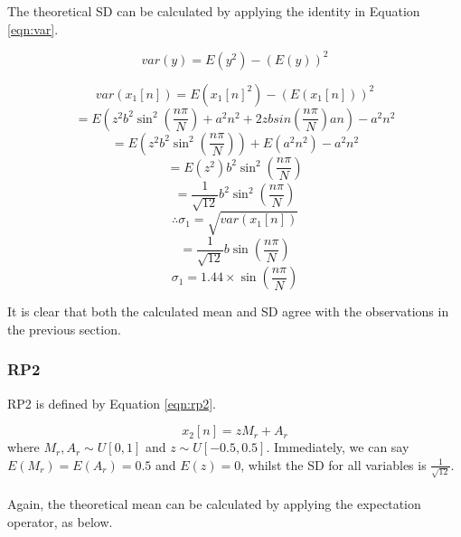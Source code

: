 \noindent
The theoretical SD can be calculated by applying the identity in Equation \ref{eqn:var}.

\begin{equation}
    \textit{var}(y) = E(y^2) - (E(y))^2
    \label{eqn:var}
\end{equation}
\begin{center}
\begin{equation}
    var(x_{1}[n]) = E({x_{1}[n]}^2) - (E({x_{1}[n]}))^2 
\end{equation}
\begin{equation}
= E(z^{2}b^{2}\sin^{2}(\frac{n \pi}{N}) + a^{2}n^{2}+2zb sin(\frac{n \pi}{N})an) - a^{2}n^{2}
\end{equation}
\begin{equation}
=E(z^{2} b^{2} \sin ^{2}(\frac{n \pi}{N}))+E(a^{2} n^{2})-a^{2} n^{2}
\end{equation}
\begin{equation}
=E(z^{2}) b^{2} \sin ^{2}(\frac{n \pi}{N})
\end{equation}
\begin{equation}
= \frac{1}{\sqrt{12}} b^{2} \sin ^{2}(\frac{n \pi}{N})
\end{equation}
\begin{equation}
\therefore \sigma_{1} =\sqrt{{var}(x_{1}[n])}
\end{equation}
\begin{equation}
=\frac{1}{\sqrt{12}} b \sin (\frac{n \pi}{N})
\end{equation}
\begin{equation}
\sigma_{1}=1.44 \times \sin \left(\frac{n \pi}{N}\right)
\end{equation}
\end{center}

\noindent
It is clear that both the calculated mean and SD agree with the observations in the previous section.

\subsubsection*{RP2}

RP2 is defined by Equation \ref{eqn:rp2}.

\begin{equation}
    x_{2}[n] = zM_{r} + A_{r}
    \label{eqn:rp2}
\end{equation}
where $M_{r}, A_{r} \sim U[0,1]$ and $z \sim U[-0.5,0.5]$. Immediately, we can say $E(M_{r}) = E(A_{r}) = 0.5$ and $E(z) = 0$, whilst the SD for all variables is $\frac{1}{\sqrt{12}}$.
\\\\
\noindent
Again, the theoretical mean can be calculated by applying the expectation operator, as below.

